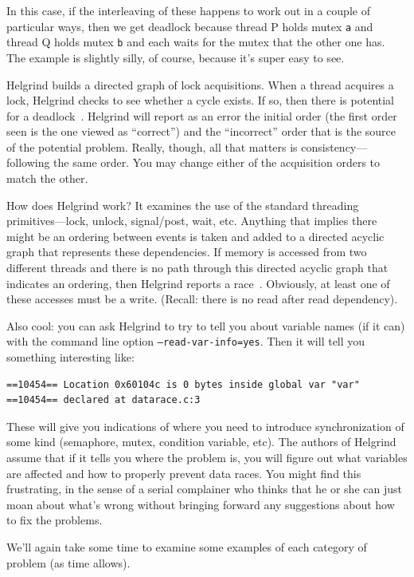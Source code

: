 \documentclass[a4paper]{report}
\begin{document}
In this case, if the interleaving of these happens to work out in a couple of particular ways, then we get deadlock because thread P holds mutex \texttt{a} and thread Q holds mutex \texttt{b} and each waits for the mutex that the other one has. The example is slightly silly, of course, because it's super easy to see.

Helgrind builds a directed graph of lock acquisitions. When a thread acquires a lock, Helgrind checks to see whether a cycle exists. If so, then there is potential for a deadlock~\cite{helgrind}. Helgrind will report as an error the initial order (the first order seen is the one viewed as ``correct'') and the ``incorrect'' order that is the source of the potential problem. Really, though, all that matters is consistency---following the same order. You may change either of the acquisition orders to match the other. 

How does Helgrind work? It examines the use of the standard threading primitives---lock, unlock, signal/post, wait, etc. Anything that implies there might be an ordering between events is taken and added to a directed acyclic graph that represents these dependencies. If memory is accessed from two different threads and there is no path through this directed acyclic graph that indicates an ordering, then Helgrind reports a race~\cite{helgrind}. Obviously, at least one of these accesses must be a write. (Recall: there is no read after read dependency).

Also cool: you can ask Helgrind to try to tell you about variable names (if it can) with the command line option \texttt{--read-var-info=yes}. Then it will tell you something interesting like:

\begin{lstlisting}
==10454== Location 0x60104c is 0 bytes inside global var "var"
==10454== declared at datarace.c:3
\end{lstlisting}

These will give you indications of where you need to introduce synchronization of some kind (semaphore, mutex, condition variable, etc). The authors of Helgrind assume that if it tells you where the problem is, you will figure out what variables are affected and how to properly prevent data races. You might find this frustrating, in the sense of a serial complainer who thinks that he or she can just moan about what's wrong without bringing forward any suggestions about how to fix the problems.

We'll again take some time to examine some examples of each category of problem (as time allows). 
\end{document}
